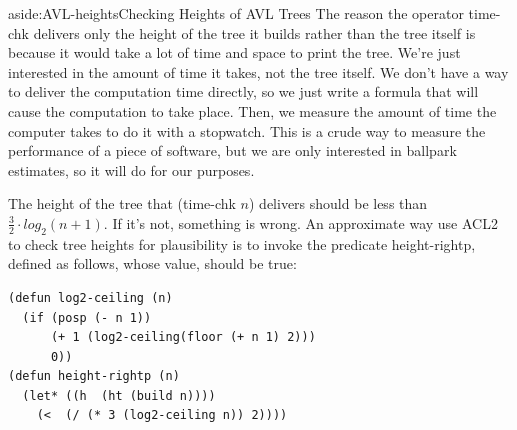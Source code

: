 \begin{aside}{aside:AVL-heights}{Checking Heights of AVL Trees}
The reason the operator \textsf{time-chk} delivers only the height
of the tree it builds rather than the tree itself is
because it would take a lot of time and space to print the tree.
We're just interested in the amount of time it takes,
not the tree itself.
We don't have a way to deliver the computation time directly,
so we just write a formula that will cause the computation to take place.
Then, we measure the amount of time the computer takes to do it
with a stopwatch.
This is a crude way to measure the performance of a piece of software,
but we are only interested in ballpark estimates,
so it will do for our purposes.

The height of the tree
that \textsf{(time-chk $n$)} delivers should be
less than
$\frac{3}{2}\cdot log_2(n+1)$.
If it's not, something is wrong.
An approximate way use ACL2 to check tree heights
for plausibility is to invoke the predicate \textsf{height-rightp},
defined as follows, whose value, should be true:

\begin{center}
\begin{code}
\begin{verbatim}
(defun log2-ceiling (n)
  (if (posp (- n 1))
      (+ 1 (log2-ceiling(floor (+ n 1) 2)))
      0))
(defun height-rightp (n)
  (let* ((h  (ht (build n))))
    (<  (/ (* 3 (log2-ceiling n)) 2))))
\end{verbatim}
\end{code}
\end{center}
\end{aside}

\begin{exercises}


\end{exercises}


